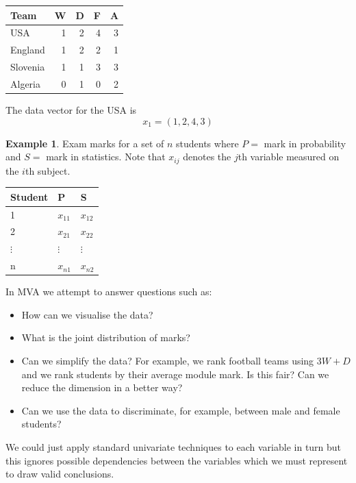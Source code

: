 \documentclass[]{book}
\providecommand{\tightlist}{%
  \setlength{\itemsep}{0pt}\setlength{\parskip}{0pt}}
\theoremstyle{definition}
\theoremstyle{definition}
\newtheorem{example}{Example}[chapter]
\theoremstyle{definition}
\theoremstyle{remark}
\begin{document}
\begin{table}[H]
\centering
\begin{tabular}{lrrrr}
\toprule
Team & W & D & F & A\\
\midrule
USA & 1 & 2 & 4 & 3\\
England & 1 & 2 & 2 & 1\\
Slovenia & 1 & 1 & 3 & 3\\
Algeria & 0 & 1 & 0 & 2\\
\bottomrule
\end{tabular}
\end{table}

The data vector for the USA is
\[x_1=(1,2,4,3)\]

\begin{example}
\protect\hypertarget{exm:unnamed-chunk-4}{}{\label{exm:unnamed-chunk-4} }Exam marks for a set of \(n\) students where \(P =\) mark in probability and \(S =\) mark in statistics.
Note that \(x_{ij}\) denotes the \(j\)th variable measured on the \(i\)th subject.
\end{example}

\begin{table}[H]
\centering
\begin{tabular}{lll}
\toprule
Student & P & S\\
\midrule
1 & $x_{11}$ & $x_{12}$\\
2 & $x_{21}$ & $x_{22}$\\
$\vdots$ & $\vdots$ & $\vdots$\\
n & $x_{n1}$ & $x_{n2}$\\
\bottomrule
\end{tabular}
\end{table}

In MVA we attempt to answer questions such as:

\begin{itemize}
\tightlist
\item
  How can we visualise the data?
\item
  What is the joint distribution of marks?
\item
  Can we simplify the data? For example, we rank football teams using \(3W+D\) and we rank students by their average module mark. Is this fair? Can we reduce the dimension in a better way?
\item
  Can we use the data to discriminate, for example, between male and female students?
\end{itemize}

We could just apply standard univariate techniques to each variable in turn but this ignores possible dependencies between the variables which we must represent to draw valid conclusions.
\end{document}
